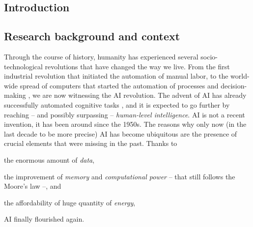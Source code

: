 
\begin{refsection}

\minitoc
\chapter{Introduction}
\label{ch:introduction}
\mtcaddchapter
\minitoc

\section{Research background and context}
\label{sec:research-background-and-context}
%
Through the course of history, humanity has experienced several socio-technological revolutions that have changed the way we live.
%
From the first industrial revolution that initiated the automation of manual labor, to the world-wide spread of computers that started the automation of processes and decision-making , we are now witnessing the \gls{AI} revolution.
%
The advent of \gls{AI} has already successfully automated cognitive tasks , and it is expected to go further by reaching -- and possibly surpassing -- \emph{human-level intelligence}.
%
\Gls{AI} is not a recent invention, it has been around since the 1950s.
%
The reasons why only now (in the last decade to be more precise) \gls{AI} has become ubiquitous are the presence of crucial elements that were missing in the past.
%
Thanks to
%
\begin{inlinelist}
    \item the enormous amount of \emph{data},
    \item the improvement of \emph{memory} and \emph{computational power} -- that still follows the Moore's law --, and
    \item the affordability of huge quantity of \emph{energy},
\end{inlinelist}
%
\gls{AI} finally flourished again.



\end{refsection}
